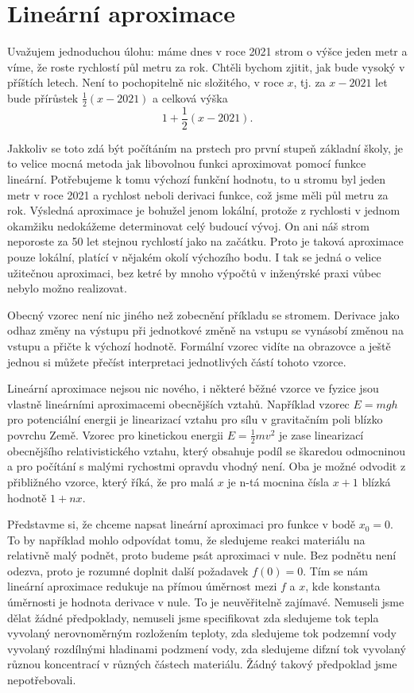 \documentclass[12pt]{article}
\begin{document}
\section*{Lineární aproximace}

Uvažujem jednoduchou úlohu: máme dnes v roce 2021 strom o výšce jeden metr a víme, že roste rychlostí půl metru za rok. Chtěli bychom zjitit, jak bude vysoký v příštích letech. Není to pochopitelně nic složitého, v roce $x$, tj. za $x-2021$ let bude přírůstek $\frac 12 (x-2021)$ a celková výška $$1+\frac 12 (x-2021).$$

Jakkoliv se toto zdá být počítáním na prstech pro první stupeň základní školy, je to velice mocná metoda jak libovolnou funkci aproximovat pomocí funkce lineární. Potřebujeme k tomu výchozí funkční hodnotu, to u stromu byl jeden metr v roce 2021 a rychlost neboli derivaci funkce, což jsme měli půl metru za rok. Výsledná aproximace je bohužel jenom lokální, protože z rychlosti v jednom okamžiku nedokážeme determinovat celý budoucí vývoj. On ani náš strom neporoste za 50 let stejnou rychlostí jako na začátku. Proto je taková aproximace pouze lokální, platící v nějakém okolí výchozího bodu. I tak se jedná o velice užitečnou aproximaci, bez ketré by mnoho výpočtů v inženýrské praxi vůbec nebylo možno realizovat.

Obecný vzorec není nic jiného než zobecnění příkladu se stromem. Derivace jako odhaz změny na výstupu při jednotkové změně na vstupu se vynásobí změnou na vstupu a přičte k výchozí hodnotě. Formální vzorec vidíte na obrazovce a ještě jednou si můžete přečíst interpretaci jednotlivých částí tohoto vzorce.

Lineární aproximace nejsou nic nového, i některé běžné vzorce ve fyzice jsou vlastně lineárními aproximacemi obecnějších vztahů. Například vzorec $E=mgh$ pro potenciální energii je linearizací vztahu pro sílu v gravitačním poli blízko povrchu Země. Vzorec pro kinetickou energii $E=\frac 12 mv^2$ je zase linearizací obecnějšího relativistického vztahu, který obsahuje podíl se škaredou odmocninou a pro počítání s malými rychostmi opravdu vhodný není. Oba je možné odvodit z přibližného vzorce, který říká, že pro malá $x$ je n-tá mocnina čísla $x+1$ blízká hodnotě $1+nx.$

Představme si, že chceme napsat lineární aproximaci pro funkce v bodě $x_0=0$. To by například mohlo odpovídat tomu, že sledujeme reakci materiálu na relativně malý podnět, proto budeme psát aproximaci v nule. Bez podnětu není odezva, proto je rozumné doplnit další požadavek $f(0)=0$. Tím se nám lineární aproximace redukuje na přímou úměrnost mezi $f$ a $x$, kde konstanta úměrnosti je hodnota derivace v nule. To je neuvěřitelně zajímavé. Nemuseli jsme dělat žádné předpoklady, nemuseli jsme specifikovat zda sledujeme tok tepla vyvolaný nerovnoměrným rozložením teploty, zda sledujeme tok podzemní vody vyvolaný rozdílnými hladinami podzmení vody, zda sledujeme difzní tok vyvolaný různou koncentrací v různých částech materiálu. Žádný takový předpoklad jsme nepotřebovali.
\end{document}
